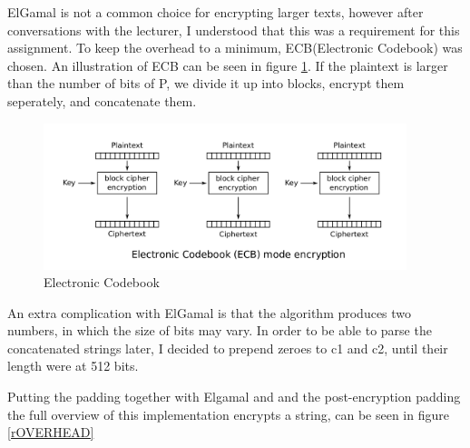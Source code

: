 \documentclass{article}
\begin{document}
ElGamal is not a common choice for encrypting larger texts, however after conversations with the lecturer, I understood that this was a requirement for this assignment. To keep the overhead to a minimum, ECB(Electronic Codebook) was chosen. An illustration of ECB can be seen in figure \ref{rECB}. If the plaintext is larger than the number of bits of P, we divide it up into blocks, encrypt them seperately, and concatenate them.
\begin{figure}[H]
 \centering
  \includegraphics[width=300pt]{img/ECB.png}
 \caption{Electronic Codebook\cite{ECB}}
 \label{rECB}
 \end{figure}

An extra complication with ElGamal is that the algorithm produces two numbers, in which the size of bits may vary. In order to be able to parse the concatenated strings later, I decided to prepend zeroes to c1 and c2, until their length were at 512 bits.

Putting the padding together with Elgamal and and the post-encryption padding the full overview of this implementation encrypts a string, can be seen in figure \ref{rOVERHEAD}
\end{document}
